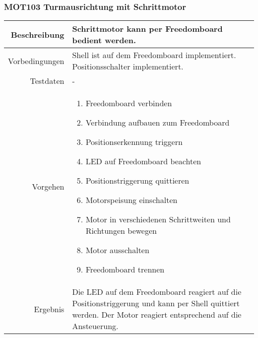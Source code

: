 \newpage
\subsubsection{MOT103 Turmausrichtung mit Schrittmotor}
\begin{table}[h!]
	\renewcommand{\arraystretch}{1.5}
	\begin{tabular}{|r|p{13cm}|}
		\hline Beschreibung	&
			Schrittmotor kann per Freedomboard bedient werden. \\ 
		\hline Vorbedingungen	&
			Shell ist auf dem Freedomboard implementiert.
			Positionsschalter implementiert. \\ 
		\hline Testdaten	& - \\ 
		\hline Vorgehen		& 
		\begin{enumerate}
			\item Freedomboard verbinden
			\item Verbindung aufbauen zum Freedomboard
			\item Positionserkennung triggern
			\item LED auf Freedomboard beachten
			\item Positionstriggerung quittieren
			\item Motorspeisung einschalten
			\item Motor in verschiedenen Schrittweiten und Richtungen bewegen
			\item Motor ausschalten
			\item Freedomboard trennen
		\end{enumerate} \\ 
		\hline Ergebnis 	&
			Die LED auf dem Freedomboard reagiert auf die
			Positionstriggerung und kann per Shell quittiert werden.
			Der Motor reagiert entsprechend auf die Ansteuerung. \\ 
		\hline 
	\end{tabular}
\end{table}

\newpage
